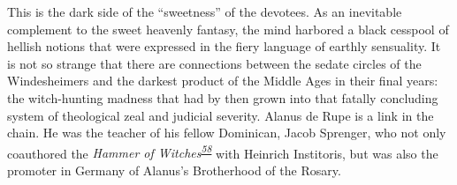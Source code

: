 This is the dark side of the ``sweetness'' of the devotees. As an
inevitable complement to the sweet heavenly fantasy, the mind harbored a
black cesspool of hellish notions that were expressed in the fiery
language of earthly sensuality. It is not so strange that there are
connections between the sedate circles of the Windesheimers and the
darkest product of the Middle Ages in their final years: the
witch-hunting madness that had by then grown into that fatally
concluding system of theological zeal and judicial severity. Alanus de
Rupe is a link in the chain. He was the teacher of his fellow Dominican,
Jacob Sprenger, who not only coauthored the \emph{Hammer of
Witches\textsuperscript{\protect\hypertarget{15_Chapter_Eight__RELIGIOUS_EXCITAT.xhtmlux5cux23id_792}{\protect\hyperlink{23_NOTES.xhtmlux5cux23id_793}{58}}}}
with Heinrich Institoris, but was also the promoter in Germany of
Alanus's Brotherhood of the Rosary.
